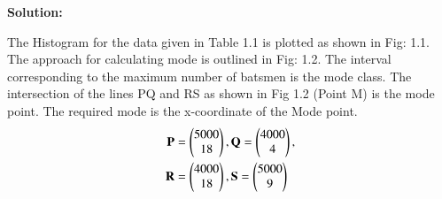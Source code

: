 \documentclass[journal,12pt,twocolumn]{IEEEtran}
\begin{document}
\begin{center}
  \textbf{Solution:}  
\end{center}
The Histogram for the data given in Table 1.1 is plotted as shown in Fig: 1.1. \\
The approach for calculating mode is outlined in Fig: 1.2. The interval corresponding to the maximum number of batsmen is the mode class. The intersection of the lines PQ and RS as shown in Fig 1.2 (Point M) is the mode point. The required mode is the x-coordinate of the Mode point.\\
\begin{align}
	\mathbf{P} &= \begin{pmatrix}5000 \\ 18\end{pmatrix},
	\mathbf{Q} = \begin{pmatrix}4000 \\ 4\end{pmatrix},
	\\
	\mathbf{R} &= \begin{pmatrix}4000 \\ 18\end{pmatrix},
	\mathbf{S} = \begin{pmatrix}5000 \\ 9\end{pmatrix}
\end{align}
\end{document}
